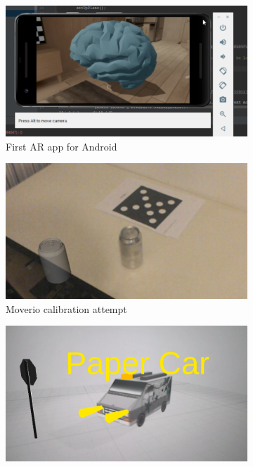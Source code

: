 \begin{figure}[H]
\centering
    \begin{subfigure}{0.45\textwidth}
        \centering
        \includegraphics[width=.95\textwidth]{figuras/sceneform.png}
        \caption{First AR app for Android}
        \label{fig:sceneform}
    \end{subfigure}
    \begin{subfigure}{0.45\textwidth}
        \centering
        \includegraphics[width=.95\linewidth]{figuras/Latinha-errada.png}
        \caption{Moverio calibration attempt}
        \label{fig:latinha}
    \end{subfigure}
    \begin{subfigure}{0.45\textwidth}
        \centering
        \includegraphics[width=.95\textwidth]{figuras/PaperCarAR.png}

\end{subfigure}
\end{figure}

